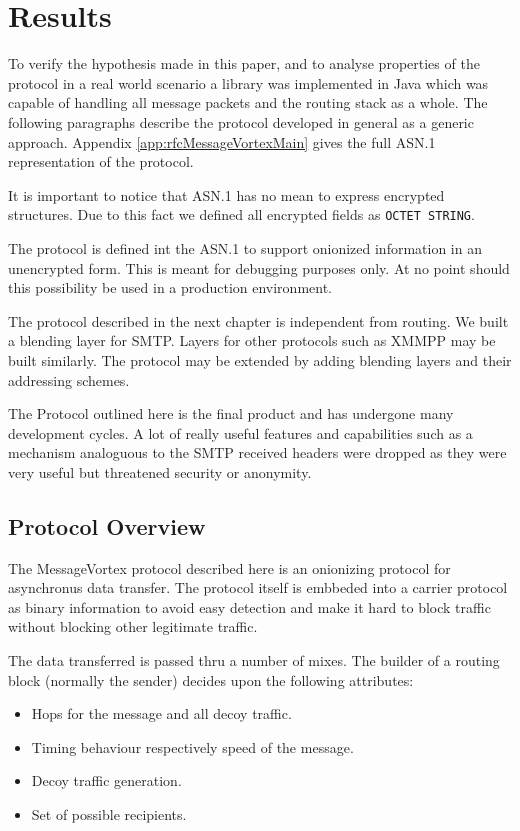 
\part{Results}
To verify the hypothesis made in this paper, and to analyse properties of the protocol in a real world scenario a library was implemented in Java which was capable of handling all message packets and the routing stack as a whole. The following paragraphs describe the protocol developed in general as a generic approach. Appendix \ref{app:rfcMessageVortexMain} gives the full ASN.1 representation of the protocol. 

It is important to notice that ASN.1 has no mean to express encrypted structures. Due to this fact we defined all encrypted fields as \verb|OCTET STRING|. 

The protocol is defined int the ASN.1 to support onionized information in an unencrypted form. This is meant for debugging purposes only. At no point should this possibility be used in a production environment.

The protocol described in the next chapter is independent from routing. We built a blending layer for SMTP. Layers for other protocols such as XMMPP may be built similarly. The protocol may be extended by adding blending layers and their addressing schemes.

The Protocol outlined here is the final product and has undergone many development cycles. A lot of really useful features and capabilities such as a mechanism analoguous to the SMTP received headers were dropped as they were very useful but threatened security or anonymity.

\chapter{Protocol Overview}
The MessageVortex protocol described here is an onionizing protocol for asynchronus data transfer. The protocol itself is embbeded into a carrier protocol as binary information to avoid easy detection and make it hard to block traffic without blocking other legitimate traffic.

The data transferred is passed thru a number of mixes. The builder of a routing block (normally the sender) decides upon the following attributes:
\begin{itemize}
	\item Hops for the message and all decoy traffic.
	\item Timing behaviour respectively speed of the message.
	\item Decoy traffic generation.
	\item Set of possible recipients.
\end{itemize}

